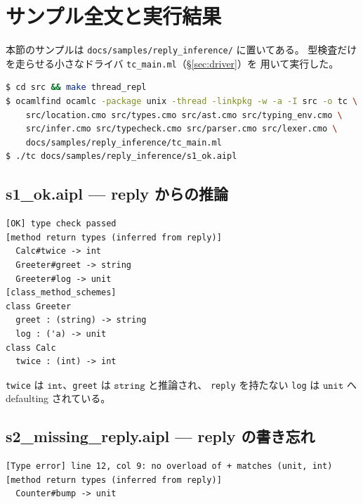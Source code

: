 \documentclass[11pt,a4paper]{ltjsarticle}
\theoremstyle{definition}
\theoremstyle{remark}
\newcommand{\ty}[1]{\ensuremath{\mathtt{#1}}}
\begin{document}
\appendix
\section{サンプル全文と実行結果}
\label{sec:samples}

本節のサンプルは \texttt{docs/samples/reply\_inference/} に置いてある。
型検査だけを走らせる小さなドライバ \texttt{tc\_main.ml}（\S\ref{sec:driver}）を
用いて実行した。

\begin{lstlisting}[language=bash]
$ cd src && make thread_repl
$ ocamlfind ocamlc -package unix -thread -linkpkg -w -a -I src -o tc \
    src/location.cmo src/types.cmo src/ast.cmo src/typing_env.cmo \
    src/infer.cmo src/typecheck.cmo src/parser.cmo src/lexer.cmo \
    docs/samples/reply_inference/tc_main.ml
$ ./tc docs/samples/reply_inference/s1_ok.aipl
\end{lstlisting}

\subsection{s1\_ok.aipl --- reply からの推論}



\begin{lstlisting}[language={}]
[OK] type check passed
[method return types (inferred from reply)]
  Calc#twice -> int
  Greeter#greet -> string
  Greeter#log -> unit
[class_method_schemes]
class Greeter
  greet : (string) -> string
  log : ('a) -> unit
class Calc
  twice : (int) -> int
\end{lstlisting}

\texttt{twice} は \ty{int}、\texttt{greet} は \ty{string} と推論され、
\texttt{reply} を持たない \texttt{log} は \ty{unit} へ defaulting されている。

\subsection{s2\_missing\_reply.aipl --- reply の書き忘れ}



\begin{lstlisting}[language={}]
[Type error] line 12, col 9: no overload of + matches (unit, int)
[method return types (inferred from reply)]
  Counter#bump -> unit
\end{lstlisting}
\end{document}
